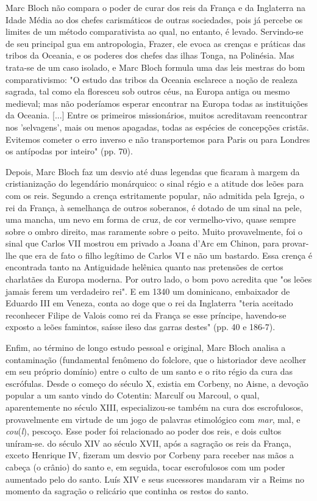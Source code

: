\documentclass[a5paper]{book}
\begin{document}
Marc Bloch não compara o poder de curar dos reis da França e da Inglaterra na Idade Média ao dos chefes carismáticos de outras sociedades, pois já percebe os limites de um método comparativista ao qual, no entanto, é levado. Servindo-se de seu principal gua em antropologia, Frazer, ele evoca as crenças e práticas das tribos da Oceania, e os poderes dos chefes das ilhas Tonga, na Polinésia. Mas trata-se de um caso isolado, e Marc Bloch formula uma das leis mestras do bom comparativismo: "O estudo das tribos da Oceania esclarece a noção de realeza sagrada, tal como ela f{\kern0pt}loresceu sob outros céus, na Europa antiga ou mesmo medieval; mas não poderíamos esperar encontrar na Europa todas as instituições da Oceania. [...] Entre os primeiros missionários, muitos acreditavam reencontrar nos 'selvagens', mais ou menos apagadas, todas as espécies de concepções cristãs. Evitemos cometer o erro inverso e não transportemos para Paris ou para Londres os antípodas por inteiro" (pp. 70).

Depois, Marc Bloch faz um desvio até duas legendas que f{\kern0pt}icaram à margem da cristianização do legendário monárquico: o sinal régio e a atitude dos leões para com os reis. Segundo a crença estritamente popular, não admitida pela Igreja, o rei da França, à semelhança de outros soberanos, é dotado de um sinal na pele, uma mancha, um nevo em forma de cruz, de cor vermelho-vivo, quase sempre sobre o ombro direito, mas raramente sobre o peito. Muito provavelmente, foi o sinal que Carlos VII mostrou em privado a Joana d'Arc em Chinon, para provar-lhe que era de fato o f{\kern0pt}ilho legítimo de Carlos VI e não um bastardo. Essa crença é encontrada tanto na Antiguidade helênica quanto nas pretensões de certos charlatães da Europa moderna. Por outro lado, o bom povo acredita que "os leões jamais ferem um verdadeiro rei". E em 1340 um dominicano, embaixador de Eduardo III em Veneza, conta ao doge que o rei da Inglaterra "teria aceitado reconhecer Filipe de Valois como rei da França se esse príncipe, havendo-se exposto a leões famintos, saísse ileso das garras destes" (pp. 40 e 186-7).

Enf{\kern0pt}im, ao término de longo estudo pessoal e original, Marc Bloch analisa a contaminação (fundamental fenômeno do folclore, que o historiador deve acolher em seu próprio domínio) entre o culto de um santo e o rito régio da cura das escrófulas. Desde o começo do século X, existia em Corbeny, no Aisne, a devoção popular a um santo vindo do Cotentin: Marculf ou Marcoul, o qual, aparentemente no século XIII, especializou-se também na cura dos escrofulosos, provavelmente em virtude de um jogo de palavras etimológico com \textit{mar}, mal, e \textit{cou}(\textit{l}), pescoço. Esse poder foi relacionado ao poder dos reis, e dois cultos uníram-se. do século XIV ao século XVII, após a sagração os reis da França, exceto Henrique IV, f{\kern0pt}izeram um desvio por Corbeny para receber nas mãos a cabeça (o crânio) do santo e, em seguida, tocar escrofulosos com um poder aumentado pelo do santo. Luís XIV e seus sucessores mandaram vir a Reims no momento da sagração o relicário que continha os restos do santo.
\end{document}
